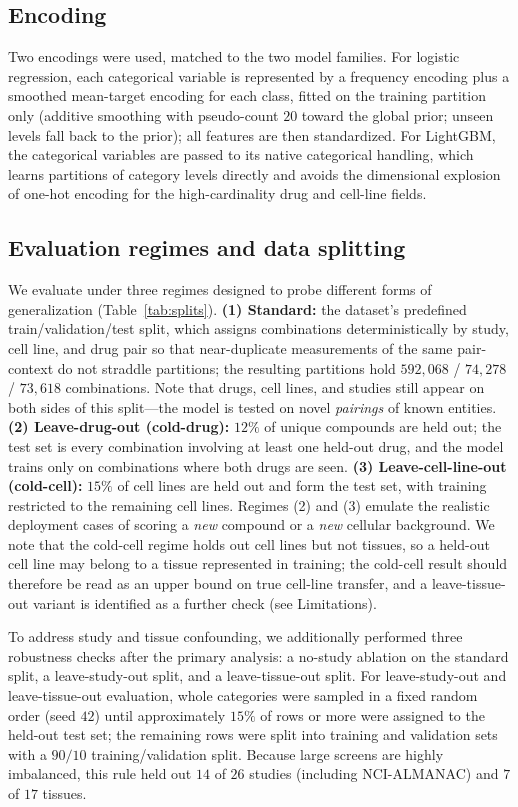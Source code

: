 \documentclass{bmcart}
\begin{document}
\subsection*{Encoding}
Two encodings were used, matched to the two model families. For logistic regression, each categorical
variable is represented by a frequency encoding plus a smoothed mean-target encoding for each class,
fitted on the training partition only (additive smoothing with pseudo-count $20$ toward the global
prior; unseen levels fall back to the prior); all features are then standardized. For LightGBM, the
categorical variables are passed to its native categorical handling, which learns partitions of
category levels directly and avoids the dimensional explosion of one-hot encoding for the
high-cardinality drug and cell-line fields.

\subsection*{Evaluation regimes and data splitting}
We evaluate under three regimes designed to probe different forms of generalization
(Table~\ref{tab:splits}). \textbf{(1) Standard:} the dataset's predefined train/validation/test split,
which assigns combinations deterministically by study, cell line, and drug pair so that near-duplicate
measurements of the same pair-context do not straddle partitions; the resulting partitions hold
$592{,}068$ / $74{,}278$ / $73{,}618$ combinations. Note that drugs, cell lines, and studies still
appear on both sides of this split---the model is tested on novel \emph{pairings} of known entities.
\textbf{(2) Leave-drug-out (cold-drug):} $12\%$ of unique compounds are held out; the test set is every
combination involving at least one held-out drug, and the model trains only on combinations where both
drugs are seen. \textbf{(3) Leave-cell-line-out (cold-cell):} $15\%$ of cell lines are held out and form
the test set, with training restricted to the remaining cell lines. Regimes (2) and (3) emulate the
realistic deployment cases of scoring a \emph{new} compound or a \emph{new} cellular background. We
note that the cold-cell regime holds out cell lines but not tissues, so a held-out cell line may belong
to a tissue represented in training; the cold-cell result should therefore be read as an upper bound on
true cell-line transfer, and a leave-tissue-out variant is identified as a further check (see
Limitations).

To address study and tissue confounding, we additionally performed three robustness checks after the
primary analysis: a no-study ablation on the standard split, a leave-study-out split, and a
leave-tissue-out split. For leave-study-out and leave-tissue-out evaluation, whole categories were
sampled in a fixed random order (seed $42$) until approximately $15\%$ of rows or more were assigned to
the held-out test set; the remaining rows were split into training and validation sets with a $90/10$
training/validation split. Because large screens are highly imbalanced, this rule held out $14$ of
$26$ studies (including NCI-ALMANAC) and $7$ of $17$ tissues.
\end{document}
